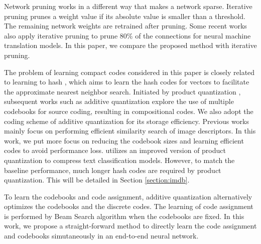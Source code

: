 \documentclass{article} %
\begin{document}
Network pruning works in a different way that makes a network sparse. Iterative pruning \citep{Han2015LearningBW} prunes a weight value if its absolute value is smaller than a threshold. The remaining network weights are retrained after pruning. Some recent works \citep{See2016CompressionON,Zhang2017TowardsCA} also apply iterative pruning to prune 80\% of the connections for neural machine translation models. In this paper, we compare the proposed method with iterative pruning.

The problem of learning compact codes considered in this paper is closely related to learning to hash \citep{Weiss2008SpectralH,Kulis2009LearningTH,Liu2012SupervisedHW}, which aims to learn the hash codes for vectors to facilitate the approximate nearest neighbor search. Initiated by product quantization \citep{Jgou2011ProductQF}, subsequent works such as additive quantization \citep{Babenko2014AdditiveQF} explore the use of multiple codebooks for source coding, resulting in compositional codes. We also adopt the coding scheme of additive quantization for its storage efficiency. Previous works mainly focus on performing efficient similarity search of image descriptors. In this work, we put more focus on reducing the codebook sizes and learning efficient codes to avoid performance loss. \citet{Joulin2016FastTextzipCT} utilizes an improved version of product quantization to compress text classification models. However, to match the baseline performance, much longer hash codes are required by product quantization. This will be detailed in Section \ref{section:imdb}.

To learn the codebooks and code assignment, additive quantization alternatively optimizes the codebooks and the discrete codes. The learning of code assignment is performed by Beam Search algorithm when the codebooks are fixed. In this work, we propose a straight-forward method to directly learn the code assignment and codebooks simutaneously in an end-to-end neural network. 

\end{document}
